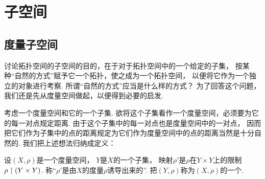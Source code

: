 \section{子空间}
\subsection{度量子空间}
讨论拓扑空间的子空间的目的，在于对于拓扑空间中的一个给定的子集，
按某种“自然的方式”赋予它一个拓扑，使之成为一个拓扑空间，
以便将它作为一个独立的对象进行考察.
所谓“自然的方式”应当是什么样的方式？
为了回答这个问题，我们还是先从度量空间做起，以便得到必要的启发.

考虑一个度量空间和它的一个子集.
欲将这个子集看作一个度量空间，必须要为它的每一对点规定距离.
由于这个子集中的每一对点也是度量空间中的一对点，
因而把它们作为子集中的点的距离规定为它们作为度量空间中的点的距离当然是十分自然的.
我们把上述想法归纳成定义：
\begin{definition}
设\((X,\rho)\)是一个度量空间，
\(Y\)是\(X\)的一个子集，
映射\(\rho'\)是\(\rho\)在\(Y \times Y\)上的限制\(\rho \upharpoonright (Y \times Y)\).
称“\(\rho'\)是由\(X\)的度量\(\rho\)诱导出来的”.
把\((Y,\rho)\)称为\((X,\rho)\)的一个.
\end{definition}

